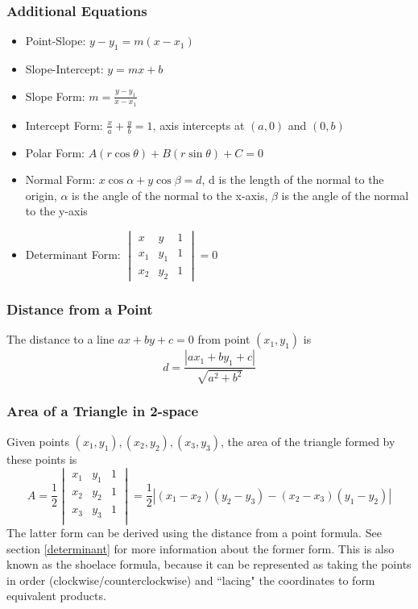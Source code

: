 \documentclass{article}
\begin{document}
\subsubsection{Additional Equations}
\begin{itemize}
    \item Point-Slope: $y-y_1 = m(x-x_1)$
    \item Slope-Intercept: $y=mx+b$
    \item Slope Form: $m=\frac{y-y_1}{x-x_1}$
    \item Intercept Form: $\frac{x}{a} + \frac{y}{b} = 1$, axis intercepts at $(a, 0)$ and $(0, b)$
    \item Polar Form: $A\left(r\cos{\theta}\right)+B\left(r\sin{\theta}\right) + C = 0$
    \item Normal Form: $x\cos{\alpha} + y\cos{\beta} = d$, d is the length of the normal to the origin, $\alpha$ is the angle of the normal to the x-axis, $\beta$ is the angle of the normal to the y-axis
    \item Determinant Form: $\begin{vmatrix}
x & y & 1\\
x_1 & y_1 & 1 \\
x_2 & y_2 & 1
\end{vmatrix}= 0$
\end{itemize}

\subsubsection{Distance from a Point} \label{pt-dist-2-space}
The distance to a line $ax+by+c=0$ from point $(x_1, y_1)$ is
$$d=\frac{\left|ax_1 + by_1 + c\right|}{\sqrt{a^2+b^2}}$$

\subsubsection{Area of a Triangle in 2-space}
Given points $(x_1, y_1), (x_2, y_2), (x_3, y_3)$, the area of the triangle formed by these points is
$$A = \frac{1}{2}\begin{vmatrix}
    x_1 & y_1 & 1 \\
    x_2 & y_2 & 1 \\
    x_3 & y_3 & 1 \\
\end{vmatrix} = \frac{1}{2}\left|(x_1-x_2)(y_2-y_3) - (x_2 - x_3)(y_1 - y_2)\right|$$
The latter form can be derived using the distance from a point formula. See section \ref{determinant} for more information about the former form.
This is also known as the shoelace formula, because it can be represented as taking the points in order (clockwise/counterclockwise) and ``lacing" the coordinates to form equivalent products.
\end{document}
